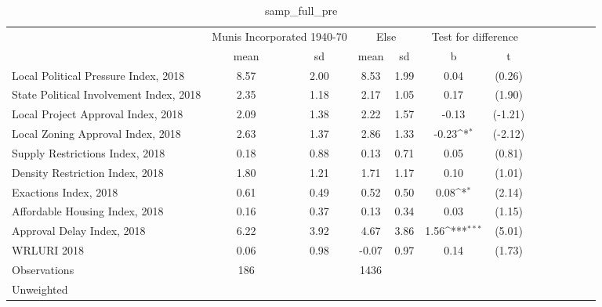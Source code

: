 \begin{table}[htbp]\centering
\def\sym#1{\ifmmode^{#1}\else\(^{#1}\)\fi}
\caption{samp\_full\_pre \label{tab1}}
\begin{tabular}{l*{3}{cccc}}
\toprule
                    &\multicolumn{2}{c}{Munis Incorporated 1940-70}&\multicolumn{2}{c}{Else} &\multicolumn{2}{c}{Test for difference}\\
                    &        mean&          sd&        mean&          sd&           b         &           t\\
\midrule
Local Political Pressure Index, 2018&        8.57&        2.00&        8.53&        1.99&        0.04         &      (0.26)\\
State Political Involvement Index, 2018&        2.35&        1.18&        2.17&        1.05&        0.17         &      (1.90)\\
Local Project Approval Index, 2018&        2.09&        1.38&        2.22&        1.57&       -0.13         &     (-1.21)\\
Local Zoning Approval Index, 2018&        2.63&        1.37&        2.86&        1.33&       -0.23\sym{*}  &     (-2.12)\\
Supply Restrictions Index, 2018&        0.18&        0.88&        0.13&        0.71&        0.05         &      (0.81)\\
Density Restriction Index, 2018&        1.80&        1.21&        1.71&        1.17&        0.10         &      (1.01)\\
Exactions Index, 2018&        0.61&        0.49&        0.52&        0.50&        0.08\sym{*}  &      (2.14)\\
Affordable Housing Index, 2018&        0.16&        0.37&        0.13&        0.34&        0.03         &      (1.15)\\
Approval Delay Index, 2018&        6.22&        3.92&        4.67&        3.86&        1.56\sym{***}&      (5.01)\\
WRLURI 2018         &        0.06&        0.98&       -0.07&        0.97&        0.14         &      (1.73)\\
\midrule
Observations        &         186&            &        1436&            &                     &            \\
\bottomrule
\multicolumn{7}{l}{\footnotesize Unweighted}\\
\end{tabular}
\end{table}
